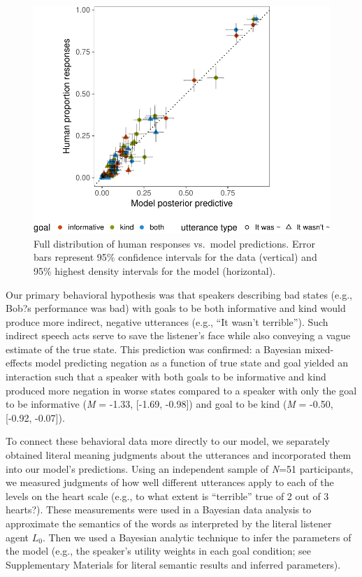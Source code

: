\documentclass[12pt]{article}
\begin{document}

\begin{figure}
\centering
\includegraphics{polite_manuscript_files/figure-latex/variance-1.pdf}
\caption{\label{fig:variance}Full distribution of human responses vs.~model
predictions. Error bars represent 95\% confidence intervals for the data
(vertical) and 95\% highest density intervals for the model
(horizontal).}
\end{figure}

Our primary behavioral hypothesis was that speakers describing bad states 
(e.g., Bob?s performance was bad) with goals to be both informative and kind 
would produce more indirect, negative utterances (e.g., \enquote{It wasn't terrible}). Such indirect
speech acts serve to save the listener's face while also conveying a
vague estimate of the true state. This prediction was confirmed: a
Bayesian mixed-effects model predicting negation as a function of true
state and goal yielded an interaction such that a speaker with both goals to be 
informative and kind produced more negation in worse states
compared to a speaker with only the goal to be informative (\emph{M} =
-1.33, {[}-1.69, -0.98{]}) and goal to be kind (\emph{M} = -0.50, {[}-0.92,
-0.07{]}).

To connect these behavioral data more directly to our model, we
separately obtained literal meaning judgments about the utterances and
incorporated them into our model's predictions. Using an independent
sample of \emph{N}=51 participants, we measured judgments of how well
different utterances apply to each of the levels on the heart scale
(e.g., to what extent is \enquote{terrible} true of 2 out of 3 hearts?).
These measurements were used in a Bayesian data analysis to
approximate the semantics of the words as interpreted by the literal
listener agent \(L_0\). Then we used a Bayesian analytic technique \cite{lee2014} 
to infer the parameters of the model (e.g., the
speaker's utility weights in each goal condition; see Supplementary
Materials for literal semantic results and inferred parameters).
\end{document}
